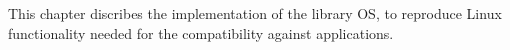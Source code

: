 This chapter discribes the implementation of the library OS,
to reproduce Linux functionality needed for the compatibility against applications.


